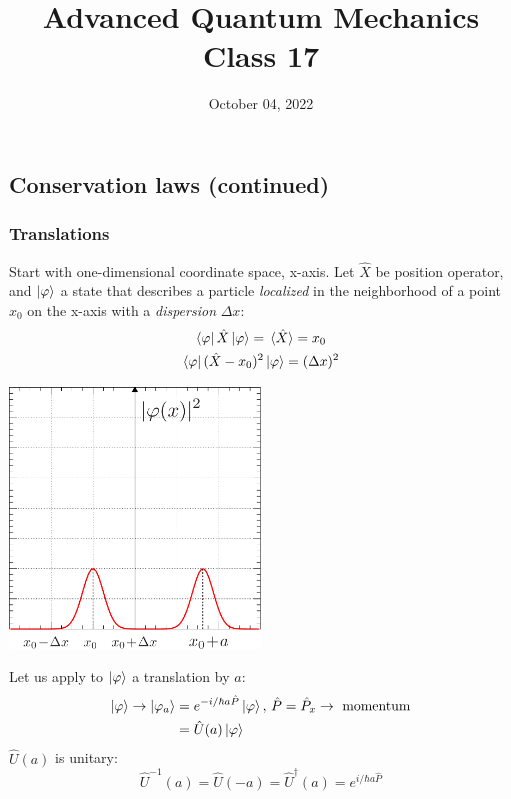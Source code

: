 \documentclass[12pt]{article}
\title{Advanced Quantum Mechanics\\Class 17}
\date{October 04, 2022}                                           %
\newcommand{\be}{\begin{equation}}
\newcommand{\ee}{\end{equation}}
\begin{document}
\maketitle

\subsection{Conservation laws (continued)}

\subsubsection{Translations}
 
Start with one-dimensional coordinate space, x-axis.
Let $\hat{X}$ be position operator, and $\ket{\varphi}$ a state
that describes a particle \emph{localized} in the neighborhood
of a point $x_0$ on the x-axis with a \emph{dispersion} $\Delta x$:
\begin{gather}
\bra{\varphi}\hat{X}\ket{\varphi} = \ev*{\hat{X}} = x_0\\
\bra{\varphi}(\hat{X}-x_0)^2\ket{\varphi} = (\Delta x)^2
\end{gather}

\begin{center}
\includegraphics[width=0.5\textwidth]{Figures/translation.pdf}
\end{center}
Let us apply to $\ket{\varphi}$ a translation by $a$:
\begin{align}
\ket{\varphi} \rightarrow \ket{\varphi_a} 
&= e^{-i/\hbar a \hat{P}} \ket{\varphi},\, \hat{P} = \hat{P}_x \rightarrow \text{ momentum}\\
&= \hat{U}(a) \ket{\varphi}
\end{align}
%
$\hat{U}(a)$ is unitary:
\be
\hat{U}^{-1}(a) = \hat{U}(-a) 
= \hat{U}^{\dagger}(a) = e^{i/\hbar a \hat{P}}
\ee
\end{document}

